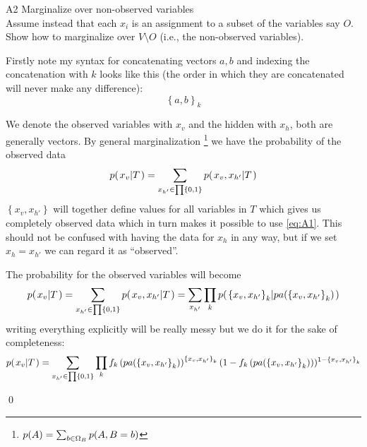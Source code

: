 \documentclass[a4paper,twoside=false,abstract=false,numbers=noenddot,
titlepage=false,headings=small,parskip=half,version=last]{scrartcl}
\begin{document}
\begin{exercise}{A2} Marginalize over non-observed variables \\
    Assume instead that each $x_i$ is an assignment to a subset of the
    variables say $O$.
    Show how to marginalize over $V\setminus O$ (i.e., the non-observed
    variables).
\end{exercise}
\begin{solution}
    Firstly note my syntax for concatenating vectors $a,b$ and indexing the
    concatenation with $k$ looks like this (the order in which they are
    concatenated will never make any difference):
    \begin{equation}
        \left\{a,b\right\}_k
    \end{equation}

    We denote the observed variables with $x_v$ and the hidden with $x_h$, both
    are generally vectors. By general marginalization
    \footnote{$p{(A)}=\sum_{b\in\Omega_B} p{(A,B=b)}$} 
    we have the probability of the observed data 
    \begin{equation}
        p{(\left. x_v \middle\vert T \right.)} = \sum_{x_{h'}\in\prod\left\{0,1\right\}}  p{(\left. x_v,x_{h'} \middle\vert T \right.)}
    \end{equation}
    $\left\{x_v,x_{h'}\right\}$ will together define values for all variables in $T$ which
    gives us completely observed data which in turn makes it possible to use
    \eqref{eq:A1}. This should not be confused with having the data for $x_h$
    in any way, but if we set $x_h = x_{h'}$ we can regard it as
    ``observed''.

    The probability for the observed variables will become
    \begin{equation}
        p{(\left. x_v \middle\vert T \right.)} = \sum_{x_{h'}\in\prod\left\{0,1\right\}}
        p{(\left. x_v,x_{h'} \middle\vert T \right.)} = \sum_{x_{h'}}\prod_k
        p{(\left. \left\{x_v,x_{h'}\right\}_k \middle\vert pa(\left\{x_v,x_{h'}\right\}_k) \right.)}
    \end{equation}
    writing everything explicitly will be really messy but we do it for the
    sake of completeness:
    \begin{equation}
        p{(\left. x_v \middle\vert T \right.)} = 
\sum_{x_{h'}\in\prod\left\{0,1\right\}}
        \prod_k f_k
            \left(
                pa(
                    \left\{x_v,x_{h'}\right\}_k
                )
            \right)
            ^{\left\{x_v,x_{h'}\right\}_k}
            (1-f_k
                \left(
                pa(
                    \left\{x_v,x_{h'}\right\}_k
                )
            \right)
            )^{1-\left\{x_v,x_{h'}\right\}_k}
    \end{equation}

    \qed

\end{solution}
\end{document}
